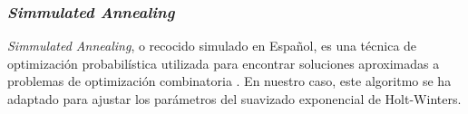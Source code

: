 \subsubsection{\textit{Simmulated Annealing}}
\textit{Simmulated Annealing}, o recocido simulado en Español, es una técnica de optimización probabilística utilizada para encontrar soluciones aproximadas a problemas de optimización combinatoria \cite{kirkpatrick1983optimization}.
En nuestro caso, este algoritmo se ha adaptado para ajustar los parámetros del suavizado exponencial de Holt-Winters.